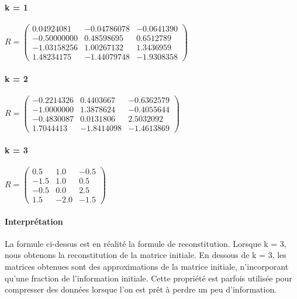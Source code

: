 \documentclass{report}
\begin{document}
\paragraph{k = 1}
\begin{center}
    $R = \begin{pmatrix}
        0.04924081 & -0.04786078 & -0.0641390\\
        -0.50000000 & 0.48598695 & 0.6512789\\
        -1.03158256 & 1.00267132 & 1.3436959\\
        1.48234175 & -1.44079748 & -1.9308358
    \end{pmatrix}$
\end{center}
\paragraph{k = 2}
\begin{center}
    $R = \begin{pmatrix}
        -0.2214326 & 0.4403667 & -0.6362579\\
        -1.0000000 & 1.3878624 & -0.4055644\\
        -0.4830087 & 0.0131806 & 2.5032092\\
        1.7044413 & -1.8414098 & -1.4613869
    \end{pmatrix}$
\end{center}
\paragraph{k = 3}
\begin{center}
    $R = \begin{pmatrix}
        0.5 & 1.0 & -0.5\\
        -1.5 & 1.0 & 0.5\\
        -0.5 & 0.0 & 2.5\\
        1.5 & -2.0 & -1.5
    \end{pmatrix}$
\end{center}
\paragraph{Interprétation}
La formule ci-dessus est en réalité la formule de reconstitution. Lorsque k = 3, nous obtenons la reconstitution de la matrice initiale. En dessous de k = 3, les matrices obtenues sont des approximations de la matrice initiale, n'incorporant qu'une fraction de l'information initiale. Cette propriété est parfois utilisée pour compresser des données lorsque l'on est prêt à perdre un peu d'information.
\end{document}
